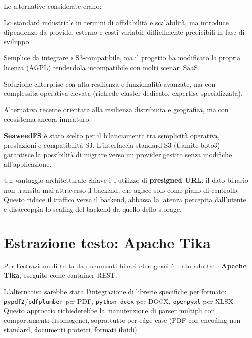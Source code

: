 Le alternative considerate erano:
\begin{description}[leftmargin=*]
    \item[S3 gestito (AWS, GCP, Azure)] Lo standard industriale in termini di affidabilit\`a
          e scalabilit\`a, ma introduce dipendenza da provider esterno e costi variabili
          difficilmente predicibili in fase di sviluppo.
    \item[MinIO] Semplice da integrare e S3-compatibile, ma il progetto ha modificato la
          propria licenza (AGPL) rendendola incompatibile con molti scenari SaaS.
    \item[Ceph] Soluzione enterprise con alta resilienza e funzionalit\`a avanzate, ma con
          complessit\`a operativa elevata (richiede cluster dedicato, expertise specializzata).
    \item[Garage] Alternativa recente orientata alla resilienza distribuita e geografica,
          ma con ecosistema ancora immaturo.
\end{description}

\textbf{SeaweedFS} \`e stato scelto per il bilanciamento tra semplicità operativa, prestazioni
e compatibilit\`a S3. L'interfaccia standard S3 (tramite boto3) garantisce la possibilit\`a di
migrare verso un provider gestito senza modifiche all'applicazione.

Un vantaggio architetturale chiave \`e l'utilizzo di \textbf{presigned URL}: il dato binario
non transita mai attraverso il backend, che agisce solo come piano di controllo. Questo riduce
il traffico verso il backend, abbassa la latenza percepita dall'utente e disaccoppia lo scaling
del backend da quello dello storage.

\section{Estrazione testo: Apache Tika}
\label{sec:stack_tika}

Per l'estrazione di testo da documenti binari eterogenei \`e stato adottato
\textbf{Apache Tika}, eseguito come container REST.

L'alternativa sarebbe stata l'integrazione di librerie specifiche per formato:
\texttt{pypdf2}/\texttt{pdfplumber} per PDF, \texttt{python-docx} per DOCX,
\texttt{openpyxl} per XLSX. Questo approccio richiederebbe la manutenzione di
parser multipli con comportamenti disomogenei, soprattutto per edge case (PDF con
encoding non standard, documenti protetti, formati ibridi).

